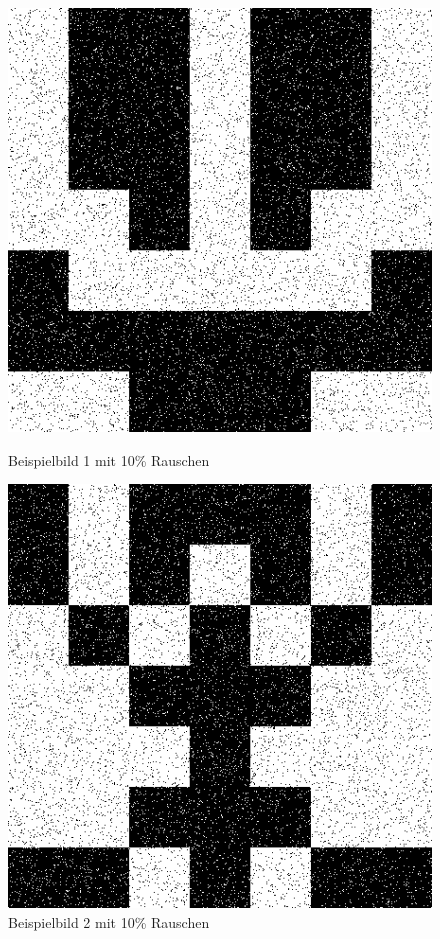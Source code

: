 \begin{figure}[hbt]
	\begin{minipage}{0.49 \textwidth}
		\includegraphics[width=\textwidth]{./Bilder/Auswertung/BeispielBilder/Picture_Example4_noise_10_pixelCnt_64_featureCnt_7}
		\caption{Beispielbild 1 mit 10\% Rauschen}
		\label{Toni_Avatar}
	\end{minipage}
	\hfill
	\begin{minipage}{0.49 \textwidth}
		\includegraphics[width=\textwidth]{./Bilder/Auswertung/BeispielBilder/Picture_Example2_noise_10_pixelCnt_64_featureCnt_7}
		\caption{Beispielbild 2 mit 10\% Rauschen}
		\label{Bryan_Avatar}
	\end{minipage}
\end{figure}

